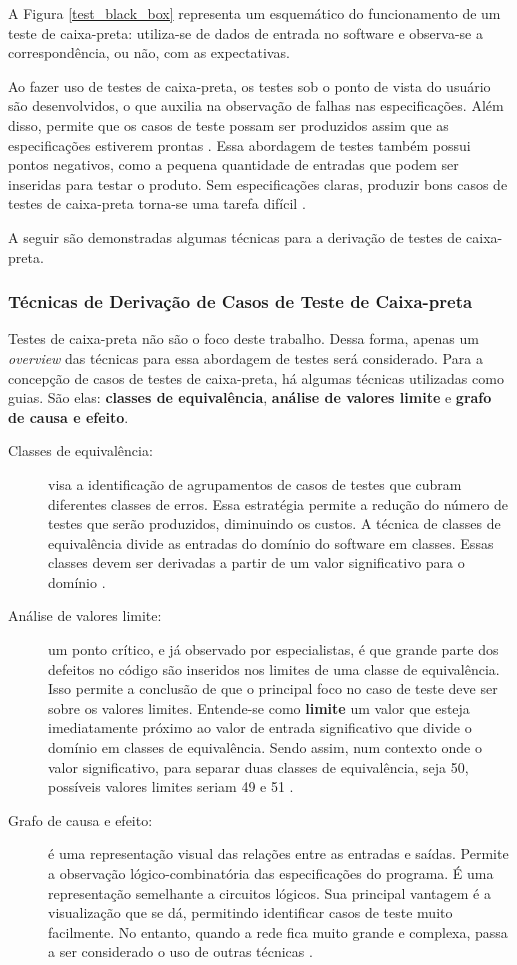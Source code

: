 A Figura \ref{test_black_box} representa um esquemático do funcionamento de um
teste de caixa-preta: utiliza-se de dados de entrada no software e observa-se a
correspondência, ou não, com as expectativas.
\par
\indent Ao fazer uso de testes de caixa-preta, os testes sob o ponto de vista
do usuário são desenvolvidos, o que auxilia na observação de falhas nas
especificações. Além disso, permite que os casos de teste possam ser produzidos
assim que as especificações estiverem prontas \cite{stf2010}. Essa abordagem de
testes também possui pontos negativos, como a pequena quantidade de entradas
que podem ser inseridas para testar o produto. Sem especificações claras,
produzir bons casos de testes de caixa-preta torna-se uma tarefa difícil
\cite{stf2010}.
\par
\indent A seguir são demonstradas algumas técnicas para a derivação de testes
de caixa-preta.

\subsubsection{Técnicas de Derivação de Casos de Teste de Caixa-preta}
Testes de caixa-preta não são o foco deste trabalho. Dessa forma, apenas um
\textit{overview} das técnicas para essa abordagem de testes será considerado.
Para a concepção de casos de testes de caixa-preta, há algumas técnicas
utilizadas como guias. São elas: \textbf{classes de equivalência},
\textbf{análise de valores limite} e \textbf{grafo de causa e efeito}.

\begin{description}
\item[Classes de equivalência:] visa a identificação de agrupamentos de casos
de testes que cubram diferentes classes de erros. Essa estratégia permite a
redução do número de testes que serão produzidos, diminuindo os custos. A
técnica de classes de equivalência divide as entradas do domínio do software em
classes. Essas classes devem ser derivadas a partir de um valor significativo
para o domínio \cite{williams2006}.
\item[Análise de valores limite:] um ponto crítico, e já observado por
especialistas, é que grande parte dos defeitos no código são inseridos nos
limites de uma classe de equivalência. Isso permite a conclusão de que o
principal foco no caso de teste deve ser sobre os valores limites. Entende-se
como \textbf{limite} um valor que esteja imediatamente próximo ao valor de
entrada significativo que divide o domínio em classes de equivalência. Sendo
assim, num contexto onde o valor significativo, para separar duas classes de
equivalência, seja 50, possíveis valores limites seriam 49 e 51
\cite{williams2006}.
\item[Grafo de causa e efeito:] é uma representação visual das relações entre
as entradas e saídas. Permite a observação lógico-combinatória das
especificações do programa. É uma representação semelhante a circuitos lógicos.
Sua principal vantagem é a visualização que se dá, permitindo identificar casos
de teste muito facilmente. No entanto, quando a rede fica muito grande e
complexa, passa a ser considerado o uso de outras técnicas
\cite{barbosaEtAl2009}.
\end{description}


